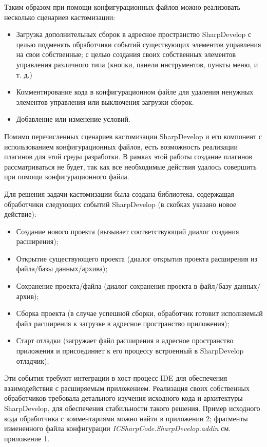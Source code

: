 Таким образом при помощи конфигурационных файлов можно реализовать несколько сценариев кастомизации:

\begin{itemize}
 \item Загрузка дополнительных сборок в адресное пространство SharpDevelop
  \subitem с целью подменять обработчики событий существующих элементов управления на свои собственные;
  \subitem с целью создания своих собственных элементов управления различного типа (кнопки, панели инструментов, пункты меню, и т. д.)
 \item Комментирование кода в конфигурационном файле для удаления ненужных элементов управления или выключения загрузки сборок.
 \item Добавление или изменение условий.
\end{itemize}
 
Помимо перечисленных сценариев кастомизации SharpDevelop и его компонент с использованием конфигурационных файлов, есть возможность реализации плагинов для этой среды разработки. В рамках этой работы создание плагинов рассматриваться не будет, так как все необходимые действия удалось совершить при помощи конфигурационного файла.
 
Для решения задачи кастомизации была создана библиотека, содержащая обработчики следующих событий SharpDevelop (в скобках указано новое действие):

\begin{itemize}
 \item Создание нового проекта (вызывает соответствующий диалог создания расширения);
 \item Открытие существующего проекта (диалог открытия проекта расширения из файла/базы данных/архива);
 \item Сохранение проекта/файла (диалог сохранения проекта в файл/базу данных/архив);
 \item Сборка проекта (в случае успешной сборки, обработчик готовит исполняемый файл расширения к загрузке в адресное пространство приложения);
 \item Старт отладки (загружает файл расширения в адресное пространство приложения и присоединяет к его процессу встроенный в SharpDevelop отладчик);
\end{itemize}

Эти события требуют интеграции в хост-процесс IDE для обеспечения взаимодействия с расширяемым приложением. Реализация своих собственных обработчиков требовала детального изучения исходного кода и архитектуры SharpDevelop, для обеспечения стабильности такого решения. Пример исходного кода обработчика с комментариями можно найти в приложении 2; фрагменты измененного файла конфигурации {\it ICSharpCode.SharpDevelop.addin} см. приложение 1.
 
